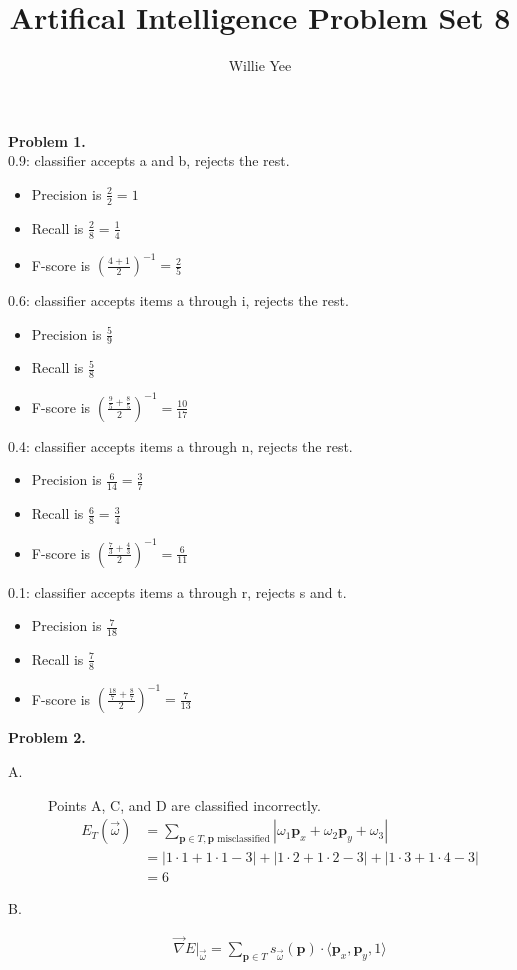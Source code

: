 \documentclass{article}
\begin{document}
\title{Artifical Intelligence Problem Set 8}
\date{}
\author{Willie Yee}
\maketitle
\noindent
\textbf{Problem 1.}\\
0.9: classifier accepts a and b, rejects the rest.
\begin{itemize}
	\item Precision is $\frac{2}{2}=1$
	\item Recall is $\frac{2}{8}=\frac{1}{4}$
	\item F-score is $(\frac{4 + 1}{2})^{-1}=\frac{2}{5}$
\end{itemize}
0.6: classifier accepts items a through i, rejects the rest.
\begin{itemize}
	\item Precision is $\frac{5}{9}$
	\item Recall is $\frac{5}{8}$
	\item F-score is $(\frac{\frac{9}{5}+\frac{8}{5}}{2})^{-1}=\frac{10}{17}$
\end{itemize}
0.4: classifier accepts items a through n, rejects the rest.
\begin{itemize}
	\item Precision is $\frac{6}{14}=\frac{3}{7}$
	\item Recall is $\frac{6}{8}=\frac{3}{4}$
	\item F-score is $(\frac{\frac{7}{3}+\frac{4}{3}}{2})^{-1}=\frac{6}{11}$
\end{itemize}
0.1: classifier accepts items a through r, rejects s and t.
\begin{itemize}
	\item Precision is $\frac{7}{18}$
	\item Recall is $\frac{7}{8}$
	\item F-score is $(\frac{\frac{18}{7}+\frac{8}{7}}{2})^{-1}=\frac{7}{13}$
\end{itemize}
\textbf{Problem 2.}
\begin{description}
	\item [A.] Points A, C, and D are classified incorrectly.
	\begin{align*}
		E_T(\vec{\omega})&=\sum_{\textbf{p}\in T,\textbf{p}\text{ misclassified}}|\omega_1\textbf{p}_x+\omega_2\textbf{p}_y+\omega_3|\\
		&=|1\cdot 1+1\cdot 1-3|+|1\cdot 2+1\cdot 2-3|+|1\cdot 3+1\cdot 4-3|\\
		&=6
	\end{align*}
	\item [B.]
	\begin{align*}
		\vec{\nabla}E|_{\vec{\omega}}=\sum_{\textbf{p}\in T}s_{\vec{\omega}}(\textbf{p})\cdot\langle\textbf{p}_x,\textbf{p}_y,1\rangle
	\end{align*}
\end{description}
\end{document}
